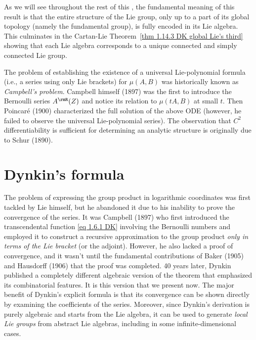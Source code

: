 \begin{rem}
    As we will see throughout the rest of this \chap, the fundamental meaning of this result is that the entire structure of the Lie group, only up to a part of its global topology (namely the fundamental group), is fully encoded in its Lie algebra. This culminates in the Cartan-Lie Theorem~\ref{thm 1.14.3 DK global Lie's third} showing that each Lie algebra corresponds to a unique connected and simply connected Lie group.
\end{rem}


\begin{hrem*}
    The problem of establishing the existence of a universal Lie-polynomial formula (i.e.,  a series using only Lie brackets) for $\mu(A,B)$ was historically known as \emph{Campbell's problem}. Campbell himself (1897) was the first to introduce the Bernoulli series $A^\rmR(Z)$ and notice its relation to $\mu(tA,B)$ at small $t$. Then Poincar\'e (1900) characterized the full solution of the above ODE (however, he failed to observe the universal Lie-polynomial series). The observation that $C^2$ differentiability is sufficient for determining an analytic structure is originally due to Schur (1890).
\end{hrem*}





\section{Dynkin's formula}

\begin{hrem*}
    The problem of expressing the group product in logarithmic coordinates was first tackled by Lie himself, but he abandoned it due to his inability to prove the convergence of the series. It was Campbell (1897) who first introduced the transcendental function \eqref{eq 1.6.1 DK} involving the Bernoulli numbers and employed it to construct a recursive approximation to the group product \emph{only in terms of the Lie bracket} (or the adjoint). However, he also lacked a proof of convergence, and it wasn't until the fundamental contributions of Baker (1905) and Hausdorff (1906) that the proof was completed. 40 years later, Dynkin published a completely different algebraic version of the theorem that emphasized its combinatorial features. It is this version that we present now. The major benefit of Dynkin's explicit formula is that its convergence can be shown directly by examining the coefficients of the series. Moreover, since Dynkin's derivation is purely algebraic and starts from the Lie algebra, it can be used to generate \emph{local Lie groups} from abstract Lie algebras, including in some infinite-dimensional cases.
\end{hrem*}

